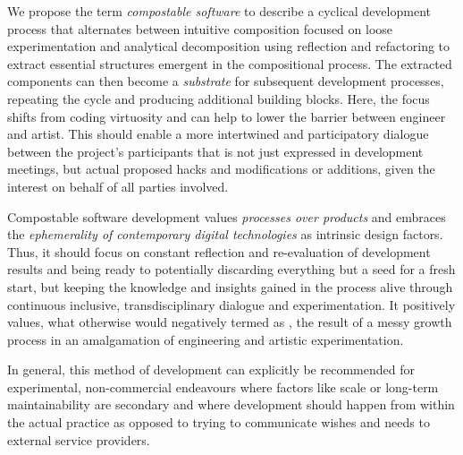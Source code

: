 We propose the term \emph{compostable software} to describe a cyclical development process that alternates between intuitive composition focused on loose experimentation and analytical decomposition using reflection and refactoring to extract essential structures emergent in the compositional process.
The extracted components can then become a \emph{substrate} for subsequent development processes, repeating the cycle and producing additional building blocks.
Here, the focus shifts from coding virtuosity and can help to lower the barrier between engineer and artist.
This should enable a more intertwined and participatory dialogue between the project's participants that is not just expressed in development meetings, but actual proposed hacks and modifications or additions, given the interest on behalf of all parties involved.

Compostable software development values \emph{processes over products} and embraces the \emph{ephemerality of contemporary digital technologies} as intrinsic design factors.
Thus, it should focus on constant reflection and re-evaluation of development results and being ready to potentially discarding everything but a seed for a fresh start, but keeping the knowledge and insights gained in the process alive through continuous inclusive, transdisciplinary dialogue and experimentation.
It positively values, what otherwise would negatively termed as , the result of a messy growth process in an amalgamation of engineering and artistic experimentation.

In general, this method of development can explicitly be recommended for experimental, non-commercial endeavours where factors like scale or long-term maintainability are secondary and where development should happen from within the actual practice as opposed to trying to communicate wishes and needs to external service providers.
